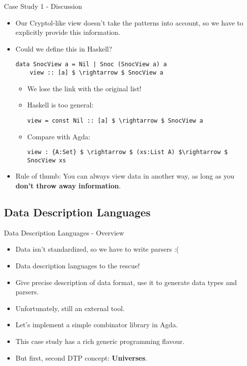 \documentclass[10pt]{beamer}
\begin{document}
\begin{frame}[fragile]{Case Study 1 - Discussion}

\begin{itemize}
\item Our Cryptol-like view doesn't take the patterns into account, so we have to explicitly provide this information.
\item Could we define this in Haskell?
	\begin{lstlisting}[mathescape=true]
	data SnocView a = Nil | Snoc (SnocView a) a
	view :: [a] $ \rightarrow $ SnocView a
	\end{lstlisting}
	\begin{itemize}
	\item We lose the link with the original list!
	\item Haskell is too general:
	\begin{lstlisting}[mathescape=true]
	view = const Nil :: [a] $ \rightarrow $ SnocView a
	\end{lstlisting}
	\item Compare with Agda:
	\begin{lstlisting}[mathescape=true]
	view : {A:Set} $ \rightarrow $ (xs:List A) $\rightarrow $ SnocView xs
	\end{lstlisting}
	\end{itemize}
\item Rule of thumb: You can always view data in another way, as long as you \textbf{don't throw away information}.
\end{itemize}

\end{frame}

\subsection{Data Description Languages}
\begin{frame}[fragile]{Data Description Languages - Overview}

\begin{itemize}
\item Data isn't standardized, so we have to write parsers :(
\item Data description languages to the rescue!
\item Give precise description of data format, use it to generate data types and parsers.
\item Unfortunately, still an external tool.
\item Let's implement a simple combinator library in Agda.
\item This case study has a rich generic programming flavour.
\item But first, second DTP concept: \textbf{Universes}.
\end{itemize}

\end{frame}
\end{document}
